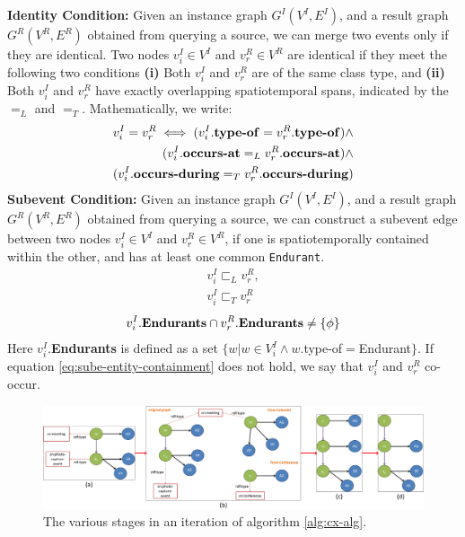 \textbf{Identity Condition:} Given an instance graph $G^I(V^I, E^I)$, and a result graph $G^R(V^R, E^R)$ obtained from querying a source, we can merge two events only if they are identical. Two nodes $v^I_i \in V^I$ and $v^R_r \in V^R$ are identical if they meet the following two conditions \textbf{(i)} Both $v^I_i$ and $v^R_r$ are of the same class type, and \textbf{(ii)} Both $v^I_i$ and $v^R_r$ have exactly overlapping spatiotemporal spans, indicated by the $=_L$ and $=_T$. Mathematically, we write: 
\begin{equation}
\label{eq:identity}
\begin{aligned}
v^I_i = v^R_r \iff (v^I_i.\text{\textbf{type-of}} = v^R_r.\text{\textbf{type-of}}) \wedge \\ 
(v^I_i.\text{\textbf{occurs-at}} =_L v^R_r.\text{\textbf{occurs-at}}) \wedge \\
(v^I_i.\text{\textbf{occurs-during}} =_T v^R_r.\text{\textbf{occurs-during}})
\end{aligned}
\end{equation}
\textbf{Subevent Condition:} Given an instance graph $G^I(V^I, E^I)$, and a result graph $G^R(V^R, E^R)$ obtained from querying a source, we can construct a subevent edge between two nodes $v^I_i \in V^I$ and $v^R_r \in V^R$, if one is spatiotemporally contained within the other, and has at least one common \texttt{Endurant}.
\begin{equation}
\label{eq:sube-st-containment}
\begin{aligned}
   v^I_i \sqsubset_L v^R_r,\\
   v^I_i \sqsubset_T v^R_r
\end{aligned}
\end{equation}
\begin{equation}
\label{eq:sube-entity-containment}
\begin{aligned}
   v^I_i.\text{\textbf{Endurants}} \cap v^R_r.\text{\textbf{Endurants}} \neq \{\phi\}\\
\end{aligned}
\end{equation}
Here $v^I_i.$\textbf{Endurants} is defined as a set $\{w | w \in V^I_i \wedge w.$type-of$ = $Endurant$\}$. If equation \eqref{eq:sube-entity-containment} does not hold, we say that $v^I_i$ and $v^R_r$ co-occur.

\begin{figure}[h]
\centering
\includegraphics[width=\textwidth]{media/exec/exec-cycle-one-line.png}
\caption{The various stages in an iteration of algorithm \ref{alg:cx-alg}.}
\label{fig:exec-cycle}
\end{figure}

